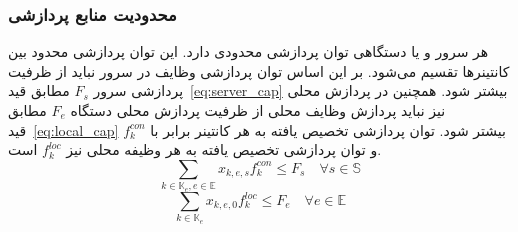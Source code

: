 \subsubsection{محدودیت منابع پردازشی}
هر سرور و یا دستگاهی توان پردازشی محدودی دارد. این توان پردازشی محدود بین کانتینرها تقسیم می‌شود. بر این اساس توان پردازشی وظایف در سرور نباید از ظرفیت پردازشی سرور $F_s$ مطابق قید~\eqref{eq:server_cap} بیشتر شود. همچنین در پردازش محلی نیز نباید پردازش وظایف محلی از ظرفیت پردازش محلی دستگاه $F_e$ مطابق قید~\eqref{eq:local_cap} بیشتر شود. توان پردازشی تخصیص یافته به هر کانتینر برابر با $f^{con}_k$ و توان پردازشی تخصیص یافته به هر وظیفه محلی نیز $f^{loc}_k$ است.
\begin{equation} \label{eq:server_cap}
    \sum_{k \in \mathbb{K}_e,e \in \mathbb{E}} x_{k,e,s} f^{con}_k \leq F_s \quad \forall s \in \mathbb{S}
\end{equation}
\begin{equation} \label{eq:local_cap}
    \sum_{k \in \mathbb{K}_e} x_{k,e,0} f^{loc}_k \leq F_e \quad \forall e \in \mathbb{E}
\end{equation}

